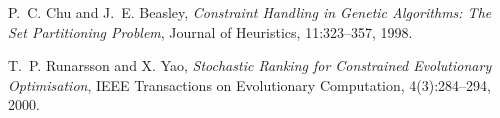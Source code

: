 \documentclass[12pt]{article}
\begin{document}
\newpage

\begin{thebibliography}{9}
  P.~C. Chu and J.~E. Beasley, 
  \emph{Constraint Handling in Genetic Algorithms: The Set Partitioning Problem},
  Journal of Heuristics, 11:323--357, 1998.

  T.~P. Runarsson and X. Yao, 
  \emph{Stochastic Ranking for Constrained Evolutionary Optimisation},
  IEEE Transactions on Evolutionary Computation, 4(3):284--294, 2000.
\end{thebibliography}
\end{document}
